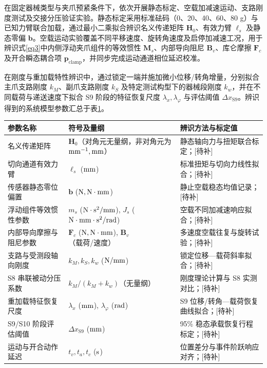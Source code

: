 \documentclass{JQRnew}
\begin{document}
在固定器械类型与夹爪预紧条件下，依次开展静态标定、空载加减速运动、支路刚度测试及交接分压验证实验。静态标定采用标准砝码（0、20、40、60、80 g）与已知力臂联合加载，通过最小二乘拟合辨识名义传递矩阵 $\bm{H}_{0}$、有效力臂 $\ell_{s}$ 及静态零偏 $\bm{b}$。空载运动实验覆盖不同平移速度、旋转角速度及启停加减速工况，用于辨识式\eqref{eq3}中内侧浮动夹爪组件的等效惯性 $\bm{M}_{s}$、内部导向阻尼 $\bm{B}_{v}$、库仑摩擦 $\bm{F}_{c}$ 及开合瞬态耦合项 $\bm{p}_{\text{clamp}}$，并同步完成运动通道相位延迟校准。

在刚度与重加载特性辨识中，通过锁定一端并施加微小位移/转角增量，分别拟合主爪支路刚度 $k_{M}$、副爪支路刚度 $k_{S}$ 及特定测试构型下的器械段刚度 $k_{w}$，并在不同载荷与递送速度下拟合 S9 阶段的特征恢复尺度 $\lambda_{x},\lambda_{\varphi}$ 与评估阈值 $\Delta x_{\text{S9}}$。辨识得到的系统模型参数汇总于表\ref{tab1}。

\begin{table}[h!t]
	\centering
	\label{tab1}
	\begin{tabular}{lll}
		\hline
		参数名称 & 符号及量纲 & 辨识方法与标定值 \\
		\hline
		名义传递矩阵 & $\bm{H}_{0}$（对角元无量纲，非对角元为 ${\rm mm}^{-1}, {\rm mm}$） & 静态轴向力与扭矩联合标定；[待补] \\
		切向通道有效力臂 & $\ell_{s}$ (${\rm mm}$) & 标准扭矩与切向力线性拟合；[待补] \\
		传感器静态零位偏置 & $\bm{b}$ (${\rm N}, {\rm N}\cdot{\rm mm}$) & 静止空载稳态均值记录；[待补] \\
		浮动组件等效惯性参数 & $m_{s}$ (${\rm N}\cdot{\rm s}^{2}/{\rm mm}$), $J_{s}$ (${\rm N}\cdot{\rm mm}\cdot{\rm s}^{2}/{\rm rad}$) & 空载不同加减速响应拟合；[待补] \\
		内部导向摩擦与阻尼参数 & $\bm{F}_{c}$ (${\rm N}, {\rm N}\cdot{\rm mm}$), $\bm{B}_{v}$（载荷/速度） & 多速度空载往复与旋转试验；[待补] \\
		支路与受测段轴向刚度 & $k_{M}, k_{S}, k_{w}$ (${\rm N}/{\rm mm}$) & 锁定位移---载荷斜率拟合；[待补] \\
		S8 串联被动分压系数 & $k_{M}/(k_{M} + k_{w})$（无量纲） & 刚度理论计算与 S8 实测对比；[待补] \\
		重加载特征恢复尺度 & $\lambda_{x}$ (${\rm mm}$), $\lambda_{\varphi}$ (${\rm rad}$) & S9 位移/转角---载荷恢复曲线拟合；[待补] \\
		S9/S10 阶段评估阈值 & $\Delta x_{\text{S9}}$ (${\rm mm}$) & 95\% 稳态承载恢复行程标定；[待补] \\
		运动与开合动作延迟 & $t_{v}, t_{a}, t_{c}$ (${\rm s}$) & 位置差分与事件阶跃响应对齐；[待补] \\
		\hline
	\end{tabular}
\end{table}
\end{document}
